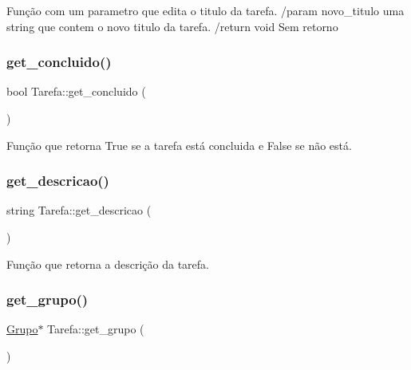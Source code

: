 Função com um parametro que edita o titulo da tarefa. /param novo\+\_\+titulo uma string que contem o novo titulo da tarefa. /return void Sem retorno \mbox{\label{classTarefa_ae6a61ad035a0685f7b201c4a726413da}} 
\subsubsection{\texorpdfstring{get\+\_\+concluido()}{get\_concluido()}}
{\footnotesize\ttfamily bool Tarefa\+::get\+\_\+concluido (\begin{DoxyParamCaption}{ }\end{DoxyParamCaption})}



Função que retorna True se a tarefa está concluida e False se não está. 

\mbox{\label{classTarefa_aa2bb888f5bc93272e6e0aa5c0f3879fa}} 
\subsubsection{\texorpdfstring{get\+\_\+descricao()}{get\_descricao()}}
{\footnotesize\ttfamily string Tarefa\+::get\+\_\+descricao (\begin{DoxyParamCaption}{ }\end{DoxyParamCaption})}



Função que retorna a descrição da tarefa. 

\mbox{\label{classTarefa_adf6a36ff108e0c1feecdfbaa38521818}} 
\subsubsection{\texorpdfstring{get\+\_\+grupo()}{get\_grupo()}}
{\footnotesize\ttfamily \hyperlink{classGrupo}{Grupo}$\ast$ Tarefa\+::get\+\_\+grupo (\begin{DoxyParamCaption}{ }\end{DoxyParamCaption})}



